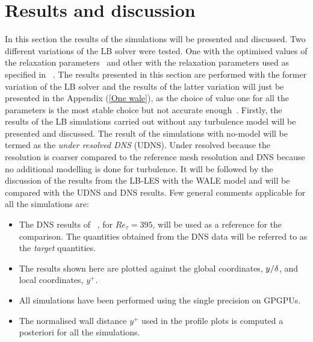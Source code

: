 \newpage

\section{Results and discussion}
In this section the results of the simulations will be presented and discussed. Two different variations of the LB solver were tested. One with the optimised values of the relaxation parameters~\cite{geier:parameter} and other with the relaxation parameters used as specified in ~\cite{geier:cumulant}. The results presented in this section are performed with the former variation of the LB solver and the results of the latter variation will just be presented in the Appendix (\ref{One wale}), as the choice of value one for all the parameters is the most stable choice but not accurate enough~\cite{geier:parameter}. Firstly, the results of the LB simulations carried out without any turbulence model will be presented and discussed. The result of the simulations with no-model will be termed as the \emph{under resolved DNS} (UDNS). Under resolved because the resolution is coarser compared to the reference mesh resolution and DNS because no additional modelling is done for turbulence. It will be followed by the discussion of the results from the LB-LES with the WALE model and will be compared with the UDNS and DNS results. Few general comments applicable for all the simulations are:

\begin{itemize}
\item The DNS results of~\cite{kim:moin:moser:87} , for $Re_\tau = 395$, will be used as a reference for the comparison. The quantities obtained from the DNS data will be referred to as the \emph{target} quantities.
\item The results shown here are plotted against the global coordinates, $y/\delta$, and local coordinates,  $y^+$.  
\item All simulations have been performed using the single precision on GPGPUs. 
\item The normalised wall distance $y^+$ used in the profile plots is computed a posteriori for all the simulations.
\end{itemize}

